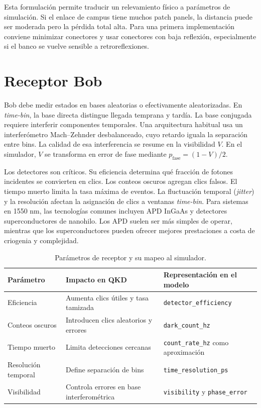 Esta formulación permite traducir un relevamiento físico a parámetros de simulación. Si el enlace de campus tiene muchos patch panels, la distancia puede ser moderada pero la pérdida total alta. Para una primera implementación conviene minimizar conectores y usar conectores con baja reflexión, especialmente si el banco se vuelve sensible a retroreflexiones.

\section{Receptor Bob}

Bob debe medir estados en bases aleatorias o efectivamente aleatorizadas. En \textit{time-bin}, la base directa distingue llegada temprana y tardía. La base conjugada requiere interferir componentes temporales. Una arquitectura habitual usa un interferómetro Mach--Zehnder desbalanceado, cuyo retardo iguala la separación entre bins. La calidad de esa interferencia se resume en la visibilidad \(V\). En el simulador, \(V\) se transforma en error de fase mediante \(p_\text{fase}=(1-V)/2\).

Los detectores son críticos. Su eficiencia determina qué fracción de fotones incidentes se convierten en clics. Los conteos oscuros agregan clics falsos. El tiempo muerto limita la tasa máxima de eventos. La fluctuación temporal (\textit{jitter}) y la resolución afectan la asignación de clics a ventanas \textit{time-bin}. Para sistemas en 1550 nm, las tecnologías comunes incluyen APD InGaAs y detectores superconductores de nanohilo. Los APD suelen ser más simples de operar, mientras que los superconductores pueden ofrecer mejores prestaciones a costa de criogenia y complejidad.

\begin{table}[H]
  \centering
  \begin{tabularx}{\textwidth}{p{}XX}
    \toprule
    Parámetro & Impacto en QKD & Representación en el modelo \\
    \midrule
    Eficiencia & Aumenta clics útiles y tasa tamizada & \texttt{detector\_efficiency} \\
    Conteos oscuros & Introducen clics aleatorios y errores & \texttt{dark\_count\_hz} \\
    Tiempo muerto & Limita detecciones cercanas & \texttt{count\_rate\_hz} como aproximación \\
    Resolución temporal & Define separación de bins & \texttt{time\_resolution\_ps} \\
    Visibilidad & Controla errores en base interferométrica & \texttt{visibility} y \texttt{phase\_error} \\
    \bottomrule
  \end{tabularx}
  \caption{Parámetros de receptor y su mapeo al simulador.}
  \label{tab:receptor_parametros}
\end{table}

